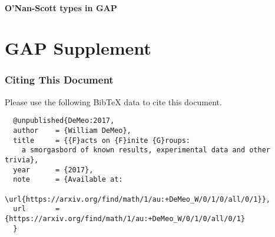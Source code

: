 \subsection{O'Nan-Scott types in GAP}
\label{sec:prim-perm-groups}


\newpage


\newpage
\part{GAP Supplement}

\newpage


\newpage


\section{Citing This Document}
Please use the following BibTeX data to cite this document.



{\small
\begin{verbatim}
  @unpublished{DeMeo:2017,
  author    = {William DeMeo},
  title     = {{F}acts on {F}inite {G}roups:
    a smorgasbord of known results, experimental data and other trivia},
  year      = {2017},
  note      = {Available at: 
         \url{https://arxiv.org/find/math/1/au:+DeMeo_W/0/1/0/all/0/1}},
  url       = {https://arxiv.org/find/math/1/au:+DeMeo_W/0/1/0/all/0/1}
  }
\end{verbatim}
}
%
%
%
%






